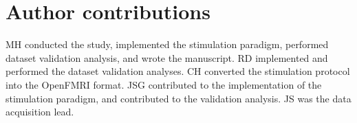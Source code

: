 \section*{Author contributions}

MH conducted the study, implemented the stimulation paradigm, performed dataset validation analysis, and wrote the manuscript.
RD implemented and performed the dataset validation analyses.
CH converted the stimulation protocol into the OpenFMRI format.
JSG contributed to the implementation of the stimulation paradigm, and contributed to the validation analysis.
JS was the data acquisition lead.
